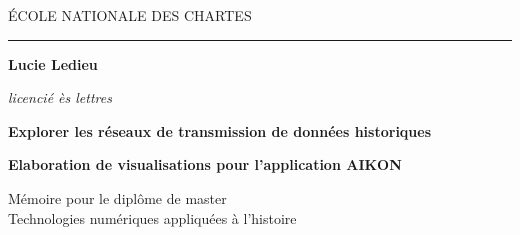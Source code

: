 \begin{titlepage}
	\begin{center}
		
		\bigskip
		
		\begin{large}
			ÉCOLE NATIONALE DES CHARTES
		\end{large}
		\begin{center}\rule{2cm}{0.02cm}\end{center}
		
		\bigskip
		\bigskip
		\bigskip
		\begin{Large}
			\textbf{Lucie Ledieu}\\
		\end{Large}
		\begin{normalsize} \textit{licencié ès lettres}\\
		\end{normalsize}
		
		\bigskip
		\bigskip
		\bigskip
		
		\begin{Huge}
			\textbf{Explorer les réseaux de transmission de données historiques}\\
		\end{Huge}
		\bigskip
		\bigskip
		\begin{LARGE}
			\textbf{Elaboration de visualisations pour l'application AIKON}\\
		\end{LARGE}
		
		\bigskip
		\bigskip
		\bigskip
		\begin{large}
		\end{large}
		\vfill
		
		\begin{large}
			Mémoire 
			pour le diplôme de master \\
			\og Technologies numériques appliquées à l'histoire~\fg\\
		\end{large}
		
	\end{center}
\end{titlepage}